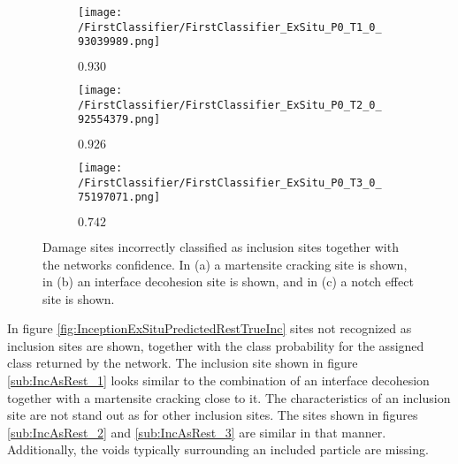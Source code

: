 \begin{figure}[H]
\centering
\begin{subfigure}{.3\textwidth}
\texttt{[image: /FirstClassifier/FirstClassifier\_ExSitu\_P0\_T1\_0\_93039989.png]}
\caption{$0.930$}
\label{sub:MasInc}
\end{subfigure}
\centering
\begin{subfigure}{.3\textwidth}
\texttt{[image: /FirstClassifier/FirstClassifier\_ExSitu\_P0\_T2\_0\_92554379.png]}
\caption{$0.926$}
\label{sub:IDasInc1}
\end{subfigure}
\centering
\begin{subfigure}{.3\textwidth}
\texttt{[image: /FirstClassifier/FirstClassifier\_ExSitu\_P0\_T3\_0\_75197071.png]}
\caption{$0.742$}
\label{sub:IDasInc2}
\end{subfigure}
\caption{Damage sites incorrectly classified as inclusion sites together with the networks confidence. In (a) a martensite cracking site is shown, in (b) an interface decohesion site is shown, and in (c) a notch effect site is shown.}
\label{fig:InceptionExSituPredictedIncTrueRest}
\end{figure}

In figure \ref{fig:InceptionExSituPredictedRestTrueInc} sites not recognized as inclusion sites are shown, together with the class probability for the assigned class returned by the network. The inclusion site shown in figure \ref{sub:IncAsRest_1} looks similar to the combination of an interface decohesion together with a martensite cracking close to it. The characteristics of an inclusion site are not stand out as for other inclusion sites. The sites shown in figures \ref{sub:IncAsRest_2} and \ref{sub:IncAsRest_3} are similar in that manner. Additionally, the voids typically surrounding an included particle are missing. \\


